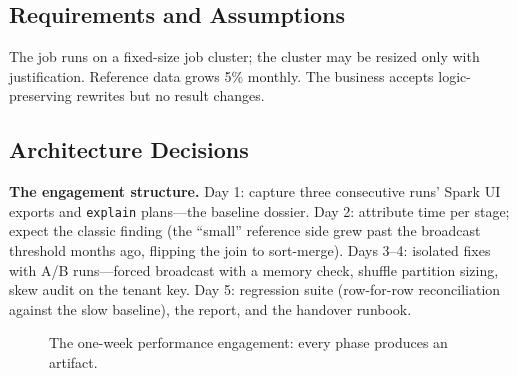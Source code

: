 \subsection{Requirements and Assumptions}
The job runs on a fixed-size job cluster; the cluster may be resized only with justification. Reference data grows 5\% monthly. The business accepts logic-preserving rewrites but no result changes.

\subsection{Architecture Decisions}
\textbf{The engagement structure.} Day 1: capture three consecutive runs' Spark UI exports and \texttt{explain} plans---the baseline dossier. Day 2: attribute time per stage; expect the classic finding (the ``small'' reference side grew past the broadcast threshold months ago, flipping the join to sort-merge). Days 3--4: isolated fixes with A/B runs---forced broadcast with a memory check, shuffle partition sizing, skew audit on the tenant key. Day 5: regression suite (row-for-row reconciliation against the slow baseline), the report, and the handover runbook.

\begin{figure}[H]
    \centering
    \caption{The one-week performance engagement: every phase produces an artifact.}
    \label{fig:ch9-engagement}
\end{figure}

